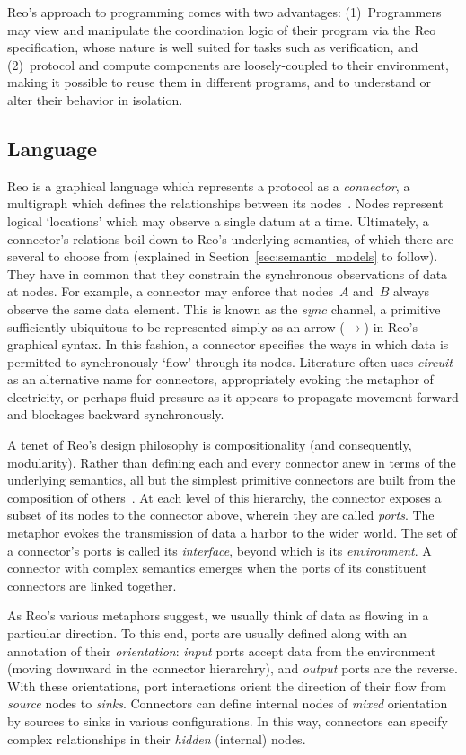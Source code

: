 Reo's approach to programming comes with two advantages: (1)~Programmers may view and manipulate the coordination logic of their program via the Reo specification, whose nature is well suited for tasks such as verification, and (2)~protocol and compute components are loosely-coupled to their environment, making it possible to reuse them in different programs, and to understand or alter their behavior in isolation.


\subsection{Language}
\label{sec:reo_lang}
Reo is a graphical language which represents a protocol as a \textit{connector}, a multigraph which defines the relationships between its nodes~\cite{arbab2011puff}. Nodes represent logical `locations' which may observe a single datum at a time. Ultimately, a connector's relations boil down to Reo's underlying semantics, of which there are several to choose from (explained in Section~\ref{sec:semantic_models} to follow). They have in common that they constrain the synchronous observations of data at nodes. For example, a connector may enforce that nodes~$A$ and~$B$ always observe the same data element. This is known as the $sync$ channel, a primitive sufficiently ubiquitous to be represented simply as an arrow ($\longrightarrow$) in Reo's graphical syntax. In this fashion, a connector specifies the ways in which data is permitted to synchronously `flow' through its 	nodes. Literature often uses \textit{circuit} as an alternative name for connectors, appropriately evoking the metaphor of electricity, or perhaps fluid pressure as it appears to propagate movement forward and blockages backward synchronously.

A tenet of Reo's design philosophy is compositionality (and consequently, modularity). Rather than defining each and every connector anew in terms of the underlying semantics, all but the simplest primitive connectors are built from the composition of others~\cite{arbab2011puff}. At each level of this hierarchy, the connector exposes a subset of its nodes to the connector above, wherein they are called \textit{ports}. The metaphor evokes the transmission of data a harbor to the wider world. The set of a connector's ports is called its \textit{interface}, beyond which is its \textit{environment}. A connector with complex semantics emerges when the ports of its constituent connectors are linked together.

As Reo's various metaphors suggest, we usually think of data as flowing in a particular direction. To this end, ports are usually defined along with an annotation of their \textit{orientation}: \textit{input} ports accept data from the environment (moving downward in the connector hierarchry), and \textit{output} ports are the reverse. With these orientations, port interactions orient the direction of their flow from \textit{source} nodes to \textit{sinks}. Connectors can define internal nodes of \textit{mixed} orientation by sources to sinks in various configurations. In this way, connectors can specify complex relationships in their \textit{hidden} (internal) nodes.

